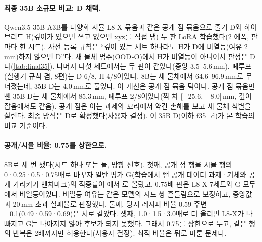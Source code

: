 \paragraph{최종 35B 소규모 비교: D 채택.}
\label{sec:final35}
Qwen3.5-35B-A3B를 다양화 시뮬 L8-X 묶음과 같은 공개 점 묶음으로 줄기 D와 하이브리드 H(깊이가 있으면 쓰고 없으면 xyz를 직접 냄) 두 판 LoRA 학습했다(2 에폭, 판마다 한 시드). 사전 등록 규칙은 ``깊이 있는 세트 하나라도 H가 D에 비열등(여유 2\,mm)하지 않으면 D''다. 새 물체 범주(OOD-O)에서 H가 비열등이 아니어서 판정은 D다(\cref{tab:final35}). 나머지 다섯 세트에서는 두 판이 같았다(중앙 3.5--5.6\,mm). 폐루프(실행기 규칙 켬, 8편)는 D 6/8, H 4/8이었다. 8B는 새 물체에서 64.6--96.9\,mm로 무너졌는데, 35B D는 4.0\,mm로 풀었다. 이 개선은 공개 점 묶음 덕이다. 공개 점 묶음만 뺀 35B D는 새 물체에서 85.3\,mm, 폐루프 2/8이었다(짝 차 [$-$25.6, $-$8.0]\,mm, 깊이 잡음에서도 같음). 공개 점은 아는 과제의 꼬리에서 약간 손해를 보고 새 물체 식별을 살린다. 최종 방식은 D로 확정했다(사용자 결정). 이 35B D(이하 f35\_d)가 본 학습의 비교 기준이다.

\begin{table}[t]
\centering
\scriptsize
\setlength{\tabcolsep}{2.5pt}
\caption{\textbf{최종 35B 소규모 비교(2 에폭).} OOD-S는 D 4.1\,mm. 공개 점 없는 판의 ---는 D와 짝 판정 같음. 폐루프는 OOD-H 0.74·0.98\,m와 OOD-O 각 2편, 실행기 규칙 켬. 판마다 한 시드. 모두 .}
\label{tab:final35}
\end{table}

\paragraph{공개/시뮬 비율: 0.75를 상한으로.}
\label{sec:evidence_ratio}
8B로 세 번 쟀다(시드 하나 또는 둘, 방향 신호). 첫째, 공개 점 행을 시뮬 행의 0·0.25·0.5·0.75배로 바꾸자 일반 평가 G(학습에서 뺀 공개 데이터 과제·기체와 공개 가리키기 벤치마크)의 적중률이 에서 로 올랐고, 0.75배 판은 L8-X 7세트와 G 모두에서 비열등이었다. 비열등 여유는 같은 모델의 시드 쌍 흔들림으로 보정하고, 중앙값과 20\,mm 초과 실패율로 판정했다. 둘째, 당시 레시피 비율 0.59 주변 ±0.1(0.49·0.59·0.69)은 서로 같았다. 셋째, 1.0·1.5·3.0배로 더 올리면 L8-X가 나빠지고 G는 나아지지 않아 후보가 되지 못했다. 그래서 0.75를 상한으로 두고, 같은 행의 반복은 2배까지만 허용한다(사용자 결정). 최적 비율은 뒤로 미룬 문제다.

